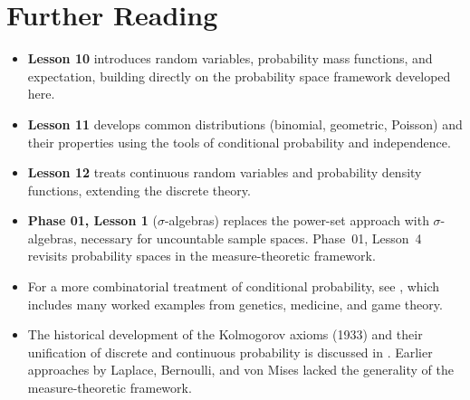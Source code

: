 \documentclass[11pt,a4paper]{article}
\begin{document}
\section{Further Reading}
\label{sec:further_reading}

\begin{itemize}
    \item \textbf{Lesson 10} introduces random variables, probability mass
    functions, and expectation, building directly on the probability space
    framework developed here.
    \item \textbf{Lesson 11} develops common distributions (binomial,
    geometric, Poisson) and their properties using the tools of conditional
    probability and independence.
    \item \textbf{Lesson 12} treats continuous random variables and
    probability density functions, extending the discrete theory.
    \item \textbf{Phase 01, Lesson 1} ($\sigma$-algebras) replaces the
    power-set approach with $\sigma$-algebras, necessary for uncountable
    sample spaces. Phase~01, Lesson~4 revisits probability spaces in the
    measure-theoretic framework.
    \item For a more combinatorial treatment of conditional probability, see
    \citet[Chapter 2]{blitzstein2019}, which includes many worked examples
    from genetics, medicine, and game theory.
    \item The historical development of the Kolmogorov axioms (1933) and
    their unification of discrete and continuous probability is discussed
    in \citet[Chapter 1]{grimmett2020}. Earlier approaches by Laplace,
    Bernoulli, and von Mises lacked the generality of the
    measure-theoretic framework.
\end{itemize}


\end{document}
